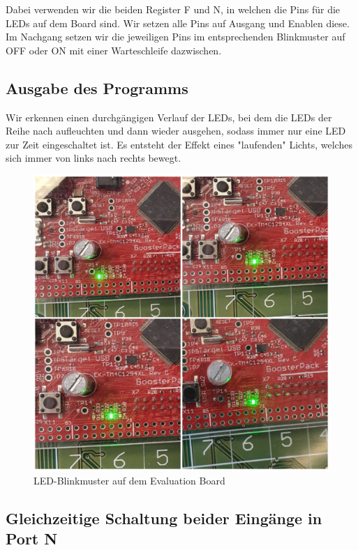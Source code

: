 \documentclass{article}
\begin{document}
Dabei verwenden wir die beiden Register F und N, in welchen die Pins für die LEDs auf dem Board sind. Wir setzen alle Pins auf Ausgang und Enablen diese. Im Nachgang setzen wir die jeweiligen Pins im entsprechenden Blinkmuster auf OFF oder ON mit einer Warteschleife dazwischen.

\subsection{Ausgabe des Programms}

Wir erkennen einen durchgängigen Verlauf der LEDs, bei dem die LEDs der Reihe nach aufleuchten und dann wieder ausgehen, sodass immer nur eine
LED zur Zeit eingeschaltet ist. Es entsteht der Effekt eines "laufenden" Lichts, welches sich immer von links nach rechts bewegt.

\newpage

\begin{figure}
    \centering
    \includegraphics[width=\textwidth]{blinkLED.jpg}
    \caption{LED-Blinkmuster auf dem Evaluation Board}
    \label{fig:lbm}
\end{figure}


\subsection{Gleichzeitige Schaltung beider Eingänge in Port N}
\end{document}
